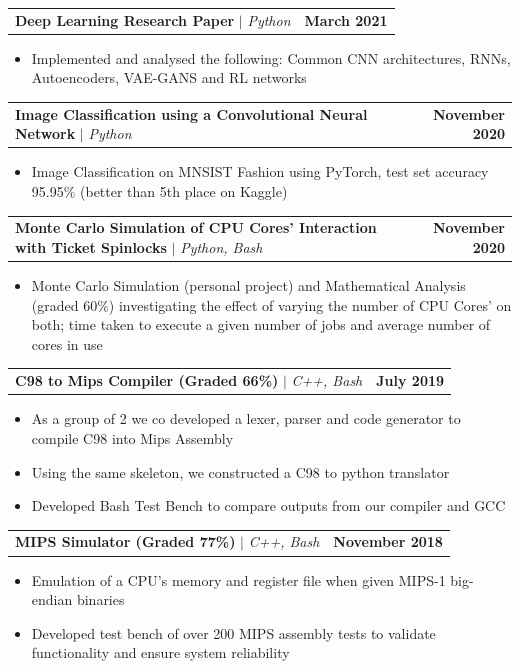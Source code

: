 \documentclass[letterpaper,11pt]{article}
\makeatletter
\newcommand{\resumeItem}[1]{
  \item\small{
    {#1 \vspace{-2pt}}
  }
}
\newcommand{\resumeProjectHeading}[2]{
    \item
    \begin{tabular*}{1.001\textwidth}{l@{\extracolsep{\fill}}r}
      \small#1 & \textbf{\small #2}\\
    \end{tabular*}\vspace{-7pt}
}
\newcommand{\resumeItemListStart}{\begin{itemize}}
\newcommand{\resumeItemListEnd}{\end{itemize}\vspace{-5pt}}
\makeatother
\begin{document}
      \resumeProjectHeading
          {\textbf{Deep Learning Research Paper} $|$ \emph{Python}}{March 2021}
        \resumeItemListStart
            \vspace{4pt}
            \resumeItem{Implemented and analysed the following: Common CNN architectures, RNNs, Autoencoders, VAE-GANS and RL networks}
          \resumeItemListEnd
          \vspace{-8pt}
          
      \resumeProjectHeading
          {\textbf{Image Classification using a Convolutional Neural Network} $|$ \emph{Python}}{November 2020}
        \resumeItemListStart
            \vspace{4pt}
            \resumeItem{Image Classification on MNSIST Fashion using PyTorch, test set accuracy 95.95\% (better than 5th place on Kaggle) }
          \resumeItemListEnd
          \vspace{-8pt}

      \resumeProjectHeading
          {\textbf{Monte Carlo Simulation of CPU Cores’ Interaction with Ticket Spinlocks} $|$ \emph{Python, Bash}}{November 2020}
        \resumeItemListStart
            \vspace{4pt}
            \resumeItem{Monte Carlo Simulation (personal project) and Mathematical Analysis (graded 60\%) investigating the effect of varying the number of CPU Cores’ on both; time taken to execute a given number of jobs and average number of cores in use }
          \resumeItemListEnd
          \vspace{-8pt}

      \resumeProjectHeading
          {\textbf{C98 to Mips Compiler (Graded 66\%)} $|$ \emph{C++, Bash}}{July 2019}
        \resumeItemListStart
            \vspace{4pt}
            \resumeItem{As a group of 2 we co developed a lexer, parser and code generator to compile C98 into Mips Assembly }
            \resumeItem{Using the same skeleton, we constructed a C98 to python translator}
            \resumeItem{Developed Bash Test Bench to compare outputs from our compiler and GCC}
          \resumeItemListEnd
          \vspace{-8pt}

          
      \resumeProjectHeading
          {\textbf{MIPS Simulator (Graded 77\%)} $|$ \emph{C++, Bash}}{November 2018}
        \resumeItemListStart
            \vspace{4pt}
            \resumeItem{Emulation of a CPU’s memory and register file when given MIPS-1 big-endian binaries}
            \resumeItem{Developed test bench of over 200 MIPS assembly tests to validate functionality and ensure system reliability}
          \resumeItemListEnd
          \vspace{-8pt}
\end{document}
